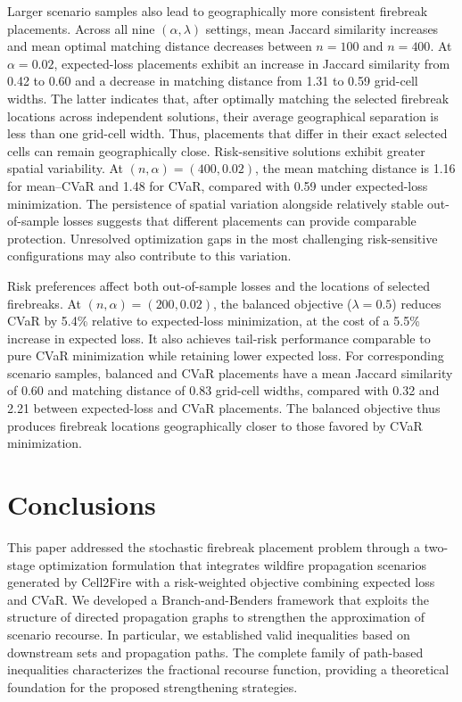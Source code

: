 \documentclass{itor}
\begin{document}
Larger scenario samples also lead to geographically more consistent
firebreak placements. Across all nine $(\alpha,\lambda)$ settings,
mean Jaccard similarity increases and mean optimal matching
distance decreases between $n=100$ and $n=400$. At $\alpha=0.02$,
expected-loss placements exhibit an increase in Jaccard similarity
from 0.42 to 0.60 and a decrease in matching distance from
1.31 to 0.59 grid-cell widths. The latter indicates that, after optimally matching the selected firebreak locations across independent solutions, their average geographical separation is less than one grid-cell width. Thus, placements that differ in
their exact selected cells can remain geographically close.
Risk-sensitive solutions exhibit greater spatial variability.
At $(n,\alpha)=(400,0.02)$, the mean matching distance is 1.16
for mean--CVaR and 1.48 for CVaR, compared with 0.59 under
expected-loss minimization. The persistence of spatial variation
alongside relatively stable out-of-sample losses suggests that
different placements can provide comparable protection.
Unresolved optimization gaps in the most challenging
risk-sensitive configurations may also contribute to this variation.

Risk preferences affect both out-of-sample losses and the locations
of selected firebreaks. At $(n,\alpha)=(200,0.02)$, the balanced
objective ($\lambda=0.5$) reduces CVaR by 5.4\% relative to
expected-loss minimization, at the cost of a 5.5\% increase in
expected loss. It also achieves tail-risk performance comparable
to pure CVaR minimization while retaining lower expected loss.
For corresponding scenario samples, balanced and CVaR placements
have a mean Jaccard similarity of 0.60 and matching distance of
0.83 grid-cell widths, compared with 0.32 and 2.21 between
expected-loss and CVaR placements. The balanced objective thus
produces firebreak locations geographically closer to those
favored by CVaR minimization.


\section{Conclusions}\label{sec:conclusions}

This paper addressed the stochastic firebreak placement problem through
a two-stage optimization formulation that integrates wildfire propagation
scenarios generated by Cell2Fire with a risk-weighted objective combining
expected loss and CVaR. We developed a Branch-and-Benders framework
that exploits the structure of directed propagation graphs to strengthen
the approximation of scenario recourse. In particular, we established
valid inequalities based on downstream sets and propagation paths.
The complete family of path-based inequalities characterizes the
fractional recourse function, providing a theoretical foundation for
the proposed strengthening strategies.
\end{document}

